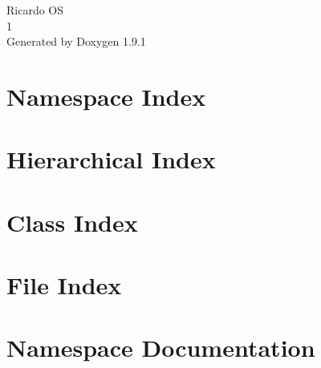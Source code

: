 \let\mypdfximage\pdfximage\def\pdfximage{\immediate\mypdfximage}\documentclass[twoside]{book}
\newcommand{\+}{\discretionary{\mbox{\scriptsize$\hookleftarrow$}}{}{}}
\newcommand{\clearemptydoublepage}{%
  \newpage{\pagestyle{empty}\cleardoublepage}%
}
\begin{document}
\raggedbottom

\hypersetup{pageanchor=false,
             bookmarksnumbered=true,
             pdfencoding=unicode
            }
\begin{titlepage}
\vspace*{7cm}
\begin{center}%
{\Large Ricardo OS \\[1ex]\large 1 }\\
\vspace*{1cm}
{\large Generated by Doxygen 1.9.1}\\
\end{center}
\end{titlepage}
\clearemptydoublepage
{}
\tableofcontents
\clearemptydoublepage
{}
\hypersetup{pageanchor=true}

\chapter{Namespace Index}

\chapter{Hierarchical Index}

\chapter{Class Index}

\chapter{File Index}

\chapter{Namespace Documentation}


\end{document}
